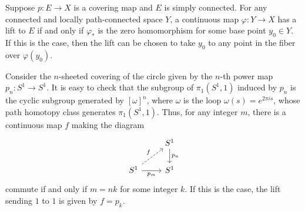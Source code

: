 \begin{corollary}
Suppose $p:E\to X$ is a covering map and $E$ is simply connected. For any connected and locally path-connected space $Y$, a continuous map $\varphi:Y\to X$ has a lift to $E$ if and only if $\varphi_*$ is the zero homomorphism for some base point $y_0\in Y$. If this is the case, then the lift can be chosen to take $y_0$ to any point in the fiber over $\varphi(y_0)$.
\end{corollary}
\begin{example}
Consider the $n$-sheeted covering of the circle given by the $n$-th power map $p_n:S^1\to S^1$. It is easy to check that the subgroup of $\pi_1(S^1,1)$ induced by $p_n$ is the cyclic subgroup generated by $[\omega]^n$, where $\omega$ is the loop $\omega(s)=e^{2\pi is}$, whose path homotopy class generates $\pi_1(S^1,1)$. Thus, for any integer $m$, there is a continuous map $f$ making the diagram
\[\begin{tikzcd}
&S^1\ar[d,"p_n"]\\
S^1\ar[ru,dashed,"f"]\ar[r,swap,"p_m"]&S^1
\end{tikzcd}\]
commute if and only if $m=nk$ for some integer $k$. If this is the case, the lift sending $1$ to $1$ is given by $f=p_k$.
\end{example}
